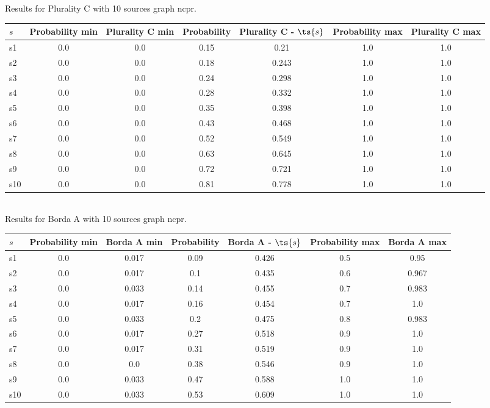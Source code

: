 \documentclass{article}
\begin{document}
\noindent Results for Plurality C with 10 sources graph ncpr.

\noindent\begin{tabular}{|l|c|c|c|c|c|c|}
\hline
$s$& Probability min & Plurality C min & Probability & Plurality C - $\ts{s}$ & Probability max & Plurality C max\\
\hline
s1 &0.0 & 0.0 & 0.15 & 0.21 & 1.0 & 1.0\\
\hline
s2 &0.0 & 0.0 & 0.18 & 0.243 & 1.0 & 1.0\\
\hline
s3 &0.0 & 0.0 & 0.24 & 0.298 & 1.0 & 1.0\\
\hline
s4 &0.0 & 0.0 & 0.28 & 0.332 & 1.0 & 1.0\\
\hline
s5 &0.0 & 0.0 & 0.35 & 0.398 & 1.0 & 1.0\\
\hline
s6 &0.0 & 0.0 & 0.43 & 0.468 & 1.0 & 1.0\\
\hline
s7 &0.0 & 0.0 & 0.52 & 0.549 & 1.0 & 1.0\\
\hline
s8 &0.0 & 0.0 & 0.63 & 0.645 & 1.0 & 1.0\\
\hline
s9 &0.0 & 0.0 & 0.72 & 0.721 & 1.0 & 1.0\\
\hline
s10 &0.0 & 0.0 & 0.81 & 0.778 & 1.0 & 1.0\\
\hline
\end{tabular}\\

\noindent Results for Borda A with 10 sources graph ncpr.

\noindent\begin{tabular}{|l|c|c|c|c|c|c|}
\hline
$s$& Probability min & Borda A min & Probability & Borda A - $\ts{s}$ & Probability max & Borda A max\\
\hline
s1 &0.0 & 0.017 & 0.09 & 0.426 & 0.5 & 0.95\\
\hline
s2 &0.0 & 0.017 & 0.1 & 0.435 & 0.6 & 0.967\\
\hline
s3 &0.0 & 0.033 & 0.14 & 0.455 & 0.7 & 0.983\\
\hline
s4 &0.0 & 0.017 & 0.16 & 0.454 & 0.7 & 1.0\\
\hline
s5 &0.0 & 0.033 & 0.2 & 0.475 & 0.8 & 0.983\\
\hline
s6 &0.0 & 0.017 & 0.27 & 0.518 & 0.9 & 1.0\\
\hline
s7 &0.0 & 0.017 & 0.31 & 0.519 & 0.9 & 1.0\\
\hline
s8 &0.0 & 0.0 & 0.38 & 0.546 & 0.9 & 1.0\\
\hline
s9 &0.0 & 0.033 & 0.47 & 0.588 & 1.0 & 1.0\\
\hline
s10 &0.0 & 0.033 & 0.53 & 0.609 & 1.0 & 1.0\\
\hline
\end{tabular}\\
\end{document}
